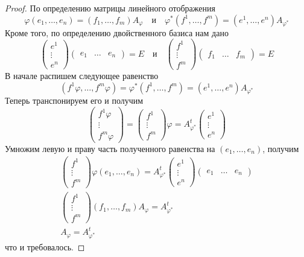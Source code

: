 \begin{proof}
По определению матрицы линейного отображения
\[
\varphi(e_1,\ldots,e_n) = (f_1,\ldots,f_m)A_{\varphi}\quad\text{и}\quad
\varphi^*(f^1,\ldots,f^m) = (e^1,\ldots,e^n)A_{\varphi^*}
\]
Кроме того, по определению двойственного базиса нам дано
\[
\begin{pmatrix}
{e^1}\\{\vdots}\\{e^n}
\end{pmatrix}
\begin{pmatrix}
{e_1}&{\ldots}&{e_n}
\end{pmatrix}
=E\quad\text{и}\quad
\begin{pmatrix}
{f^1}\\{\vdots}\\{f^m}
\end{pmatrix}
\begin{pmatrix}
{f_1}&{\ldots}&{f_m}
\end{pmatrix}
=E
\]
В начале распишем следующее равенство
\[
(f^1\varphi,\ldots,f^m\varphi)=\varphi^*(f^1,\ldots,f^m) = (e^1,\ldots,e^n)A_{\varphi^*}
\]
Теперь транспонируем его и получим
\[
\begin{pmatrix}
{f^1 \varphi}\\{\vdots}\\{f^m\varphi}
\end{pmatrix}
=
\begin{pmatrix}
{f^1}\\{\vdots}\\{f^m}
\end{pmatrix} \varphi
=
A_{\varphi^*}^t
\begin{pmatrix}
{e^1}\\{\vdots}\\{e^n}
\end{pmatrix}
\]
Умножим левую и праву часть полученного равенства на $(e_1,\ldots,e_n)$, получим
\begin{gather*}
\begin{pmatrix}
{f^1}\\{\vdots}\\{f^m}
\end{pmatrix} 
\varphi (e_1,\ldots,e_n)
=
A_{\varphi^*}^t
\begin{pmatrix}
{e^1}\\{\vdots}\\{e^n}
\end{pmatrix}
\begin{pmatrix}
{e_1}&{\ldots}&{e_n}
\end{pmatrix}\\
\begin{pmatrix}
{f^1}\\{\vdots}\\{f^m}
\end{pmatrix} 
(f_1,\ldots,f_m)A_{\varphi}
=
A_{\varphi^*}^t\\
A_{\varphi} = A_{\varphi^*}^t
\end{gather*}
что и требовалось.
\end{proof}


